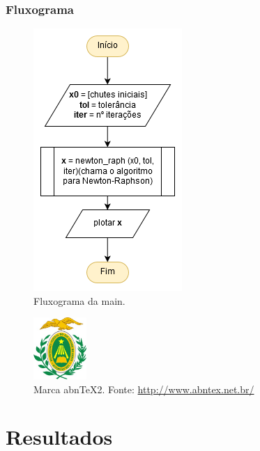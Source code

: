 \documentclass[aspectratio=1610]{beamer}
\begin{document}

\begin{frame}
\frametitle{Fluxograma}


\begin{figure}
  \centering
  \includegraphics[scale=0.55]{Imagens/diag_main.png}
  \caption{Fluxograma da main.}
\end{figure}


\end{frame}


\begin{frame}

\begin{figure}
  \centering
  \includegraphics[width=2cm]{ufrn.jpg}
  \caption{Marca abnTeX2. Fonte: \url{http://www.abntex.net.br/}}
\end{figure}

\end{frame}

\section{Resultados}
\end{document}
